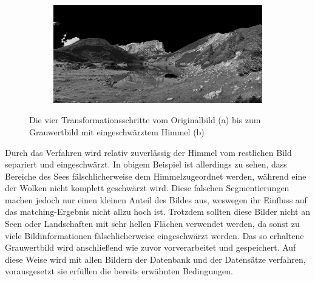 \documentclass[12pt,a4paper,titlepage]{scrartcl}
\begin{document}
\begin{figure}[h!]
\begin{subfigure}[c]{0.49\textwidth}
\label{simg:Alle_Mask}
\end{subfigure}
%
\begin{subfigure}[c]{0.49\textwidth}
\includegraphics[width=\textwidth]{../Bilder/Sky_Blackening_ThirdStep.jpg}
\label{simg:Alle_sky_black}
\end{subfigure}
\caption[Kontrasttransformation für sky blackening]{Die vier Transformationsschritte vom Originalbild (a) bis zum Grauwertbild mit eingeschwärztem Himmel (b)}\label{img:Alle_Trans}
\end{figure} 

Durch das Verfahren wird relativ zuverlässig der Himmel vom restlichen Bild separiert und eingeschwärzt. In obigem Beispiel ist allerdings zu sehen, dass Bereiche des Sees fälschlicherweise dem Himmelzugeordnet werden, während eine der Wolken nicht komplett geschwärzt wird. Diese falschen Segmentierungen machen jedoch nur einen kleinen Anteil des Bildes aus, weswegen ihr Einfluss auf das matching-Ergebnis nicht allzu hoch ist. Trotzdem sollten diese Bilder nicht an Seen oder Landschaften mit sehr hellen Flächen verwendet werden, da sonst zu viele Bildinformationen fälschlicherweise eingeschwärzt werden. Das so erhaltene Grauwertbild wird anschließend wie zuvor vorverarbeitet und gespeichert. Auf diese Weise wird mit allen Bildern der Datenbank und der Datensätze verfahren, vorausgesetzt sie erfüllen die bereits erwähnten Bedingungen. 
\end{document}
